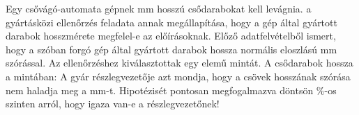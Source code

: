 
Egy csővágó-automata gépnek  mm hosszú csődarabokat kell levágnia. 
a gyártásközi ellenőrzés feladata annak megállapítása, hogy a gép által gyártott
darabok hosszmérete megfelel-e az előírásoknak. Előző adatfelvételből ismert,
hogy a szóban forgó gép által gyártott darabok hossza normális eloszlású  mm
szórással. Az ellenőrzéshez kiválasztottak egy  elemű mintát. A
csődarabok hossza a mintában:
A gyár részlegvezetője azt mondja, hogy a csövek hosszának szórása nem 
haladja meg a mm-t. Hipotézisét pontosan megfogalmazva döntsön 
\%-os szinten arról, hogy igaza van-e a részlegvezetőnek!